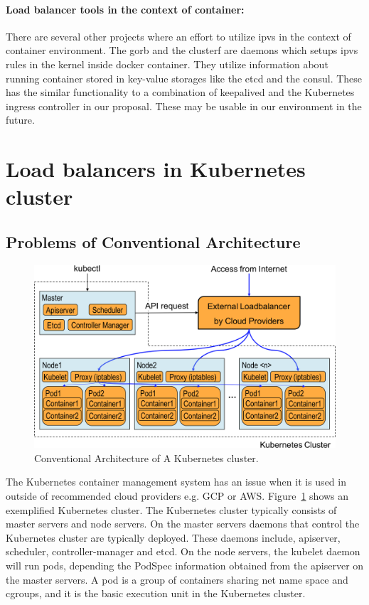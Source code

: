 \paragraph{\bf Load balancer tools in the context of container:}
There are several other projects where an effort to utilize ipvs in the context of container environment.
The gorb\cite{Sibiryov2015} and the clusterf\cite{Aaltodoc:http://urn.fi/URN:NBN:fi:aalto-201611025433} are daemons 
which setups ipvs rules in the kernel inside docker container. They utilize information about running container stored in key-value storages
like the etcd\cite{CoreOSEtcd} and the consul\cite{HashiCorpConsul}. 
These has the similar functionality to a combination of keepalived and the Kubernetes ingress controller in our proposal.
These may be usable in our environment in the future.

\section{Load balancers in Kubernetes cluster}\label{Load balancers in Kubernetes cluster}

\subsection{Problems of Conventional Architecture}

\begin{figure}
\includegraphics[width=\columnwidth]{Figs/K8sConventional}
\caption{Conventional Architecture of A Kubernetes cluster.}
\label{fig:K8sConventional}
\end{figure}

The Kubernetes container management system has an issue when it is used in outside of recommended cloud providers e.g. GCP or AWS.
Figure~\ref{fig:K8sConventional} shows an exemplified Kubernetes cluster.
The Kubernetes cluster typically consists of master servers and node servers.
On the master servers daemons that control the Kubernetes cluster are typically deployed. 
These daemons include, apiserver, scheduler, controller-manager and etcd. 
On the node servers, the kubelet daemon will run pods, depending the PodSpec information obtained from the apiserver on the master servers.
A pod is a group of containers sharing net name space and cgroups, 
and it is the basic execution unit in the Kubernetes cluster.

